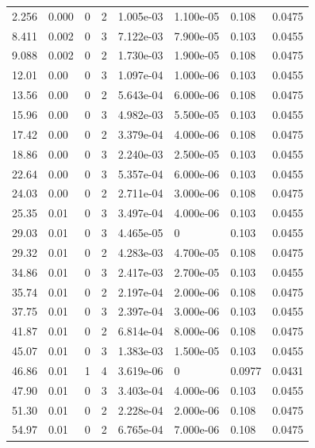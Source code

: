 \documentclass[preview]{standalone}
\begin{document}
{{\begin{tabular}{L{1.2cm}C{1.2cm} C{0.3cm}C{0.5cm} C{1.4cm}C{1.4cm} C{1.4cm}C{1.4cm}}
  2.256  &  0.000  & 0     &  2 &  1.005e-03  & 1.100e-05  & 0.108 &  0.0475   \\ 
  8.411  &  0.002  & 0     &  3 &  7.122e-03  & 7.900e-05  & 0.103 &  0.0455   \\ 
  9.088  &  0.002  & 0     &  2 &  1.730e-03  & 1.900e-05  & 0.108 &  0.0475   \\ 
  12.01  &  0.00  & 0     &  3 &  1.097e-04  & 1.000e-06  & 0.103 &  0.0455   \\ 
  13.56  &  0.00  & 0     &  2 &  5.643e-04  & 6.000e-06  & 0.108 &  0.0475   \\ 
  15.96  &  0.00  & 0     &  3 &  4.982e-03  & 5.500e-05  & 0.103 &  0.0455   \\ 
  17.42  &  0.00  & 0     &  2 &  3.379e-04  & 4.000e-06  & 0.108 &  0.0475   \\ 
  18.86  &  0.00  & 0     &  3 &  2.240e-03  & 2.500e-05  & 0.103 &  0.0455   \\ 
  22.64  &  0.00  & 0     &  3 &  5.357e-04  & 6.000e-06  & 0.103 &  0.0455   \\ 
  24.03  &  0.00  & 0     &  2 &  2.711e-04  & 3.000e-06  & 0.108 &  0.0475   \\ 
  25.35  &  0.01  & 0     &  3 &  3.497e-04  & 4.000e-06  & 0.103 &  0.0455   \\ 
  29.03  &  0.01  & 0     &  3 &  4.465e-05  & 0  & 0.103 &  0.0455   \\ 
  29.32  &  0.01  & 0     &  2 &  4.283e-03  & 4.700e-05  & 0.108 &  0.0475   \\ 
  34.86  &  0.01  & 0     &  3 &  2.417e-03  & 2.700e-05  & 0.103 &  0.0455   \\ 
  35.74  &  0.01  & 0     &  2 &  2.197e-04  & 2.000e-06  & 0.108 &  0.0475   \\ 
  37.75  &  0.01  & 0     &  3 &  2.397e-04  & 3.000e-06  & 0.103 &  0.0455   \\ 
  41.87  &  0.01  & 0     &  2 &  6.814e-04  & 8.000e-06  & 0.108 &  0.0475   \\ 
  45.07  &  0.01  & 0     &  3 &  1.383e-03  & 1.500e-05  & 0.103 &  0.0455   \\ 
  46.86  &  0.01  & 1     &  4 &  3.619e-06  & 0  & 0.0977 &  0.0431   \\ 
  47.90  &  0.01  & 0     &  3 &  3.403e-04  & 4.000e-06  & 0.103 &  0.0455   \\ 
  51.30  &  0.01  & 0     &  2 &  2.228e-04  & 2.000e-06  & 0.108 &  0.0475   \\ 
  54.97  &  0.01  & 0     &  2 &  6.765e-04  & 7.000e-06  & 0.108 &  0.0475   \\ 

\end{tabular}}}
\end{document}
